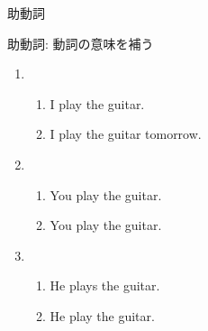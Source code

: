 \documentclass[aspectratio=169,xcolor={dvipsnames,table}]{beamer}
\begin{document}
\begin{frame}[plain]{助動詞}
 \Large

助動詞: 動詞の意味を補う

\begin{enumerate}
 \item \begin{enumerate}
	\item I play the guitar.
	\item I  play the guitar tomorrow.
       \end{enumerate}
 \item \begin{enumerate}
	\item You play the guitar.
	\item You  play the guitar.
       \end{enumerate}
 \item \begin{enumerate}
	\item He plays the guitar.
	\item He  play the guitar.
       \end{enumerate}
\end{enumerate}
\mbox{}\hfill{\scriptsize {}}
\end{frame}
\end{document}
